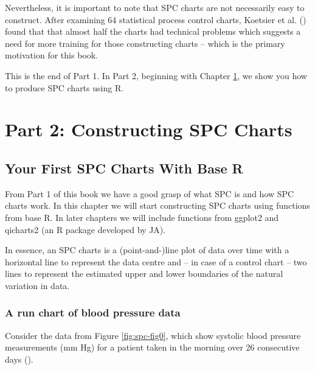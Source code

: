 \documentclass[
]{book}
\begin{document}
Nevertheless, it is important to note that SPC charts are not necessarily easy to construct. After examining 64 statistical process control charts, Koetsier et al. () found that that almost half the charts had technical problems which suggests a need for more training for those constructing charts -- which is the primary motivation for this book.

This is the end of Part 1. In Part 2, beginning with Chapter \ref{first-chart}, we show you how to produce SPC charts using R.

\part*{Part 2: Constructing SPC Charts}\label{part-part-2-constructing-spc-charts}

\chapter{Your First SPC Charts With Base R}\label{first-chart}

From Part 1 of this book we have a good grasp of what SPC is and how SPC charts work. In this chapter we will start constructing SPC charts using functions from base R. In later chapters we will include functions from ggplot2 and qicharts2 (an R package developed by JA).

In essence, an SPC charts is a (point-and-)line plot of data over time with a horizontal line to represent the data centre and -- in case of a control chart -- two lines to represent the estimated upper and lower boundaries of the natural variation in data.

\section{A run chart of blood pressure data}\label{a-run-chart-of-blood-pressure-data}

Consider the data from Figure \ref{fig:spc-fig0}, which show systolic blood pressure measurements (mm Hg) for a patient taken in the morning over 26 consecutive days ().
\end{document}
